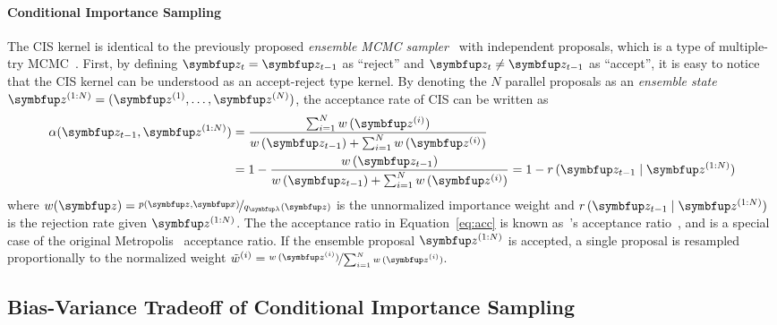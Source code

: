 \paragraph{Conditional Importance Sampling}
The CIS kernel is identical to the previously proposed \textit{ensemble MCMC sampler}~\citep{neal_mcmc_2011a, austad_parallel_2007} with independent proposals, which is a type of multiple-try MCMC~\citep{martino_review_2018}.
First, by defining \(\vz_t = \vz_{t-1}\) as ``reject'' and \(\vz_t \neq \vz_{t-1}\) as ``accept'', it is easy to notice that the CIS kernel can be understood as an accept-reject type kernel.
By denoting the \(N\) parallel proposals as an \textit{ensemble state} \(\vz^{(1:N)} = (\vz^{(1)}, \ldots, \vz^{(N)})\), the acceptance rate of CIS can be written as
\begin{align}
  \alpha(\vz_{t-1}, \vz^{(1:N)})
  &= \frac{\sum^{N}_{i=1} w\,(\vz^{(i)})}{w\,(\vz_{t-1}) + \sum^{N}_{i=1} w\,(\vz^{(i)})} \nonumber \\
  &= 1 - \frac{w\,(\vz_{t-1})}{w\,(\vz_{t-1}) + \sum^{N}_{i=1} w\,(\vz^{(i)})}
  = 1 - r\,(\vz_{t-1}\mid\vz^{(1:N)})\label{eq:acc}
\end{align}
where \(w(\vz) = \nicefrac{p(\vz,\vx)}{q_{\vlambda}(\vz)}\) is the unnormalized importance weight and \(r\,(\vz_{t-1}\mid \vz^{(1:N)})\) is the rejection rate given \(\vz^{(1:N)}\).
The the acceptance ratio in Equation~\eqref{eq:acc} is known as~\citeauthor{barker_monte_1965}'s acceptance ratio~\citep{barker_monte_1965}, and is a special case of the original Metropolis~\cite{metropolis_equation_1953} acceptance ratio.
If the ensemble proposal \(\vz^{(1:N)}\) is accepted, a single proposal is resampled proportionally to the normalized weight \(\tilde{w}^{(i)} = \nicefrac{w\,(\vz^{(i)})}{\sum_{i=1}^N w\,(\vz^{(i)}) }\).


\subsection{Bias-Variance Tradeoff of Conditional Importance Sampling}\label{section:bias_variance}
